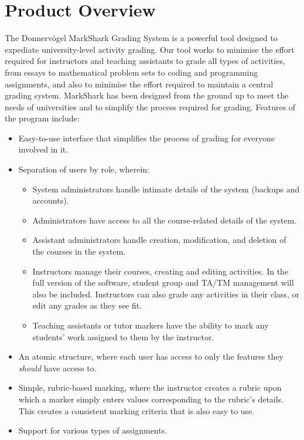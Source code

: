 \documentclass{article}
\begin{document}
\section{Product Overview}  %
The Donnervögel MarkShark Grading System is a powerful tool designed to 
expediate university-level activity grading. Our tool works to minimise the effort 
required for instructors and teaching assistants to grade all types of activities, 
from essays to mathematical problem sets to coding and programming assignments,
and also to minimise the effort required to maintain a central grading system.
MarkShark has been designed from the ground up to meet the needs of universities and 
to simplify the process required for grading. Features of the program include:
\begin{itemize}
  \item Easy-to-use interface that simplifies the process of grading for everyone
    involved in it.
  \item Separation of users by role, wherein:
    \begin{itemize}
      \item System administrators handle intimate details of the system (backups and
	accounts).
      \item Administrators have access to all the course-related details of the system.
      \item Assistant administrators handle creation, modification, and deletion of the
	courses in the system.
      \item Instructors manage their courses, creating and editing activities.
        In the full version of the software, student group and TA/TM management
        will also be included. Instructors can also grade any activities in their
        class, or edit any grades as they see fit.
      \item Teaching assistants or tutor markers have the ability to mark any students'
	work assigned to them by the instructor.
    \end{itemize}
  \item An atomic structure, where each user has access to only the features they 
    \emph{should} have access to.
  \item Simple, rubric-based marking, where the instructor creates a rubric upon which
    a marker simply enters values corresponding to the rubric's details. This creates
    a consistent marking criteria that is also easy to use.
  \item Support for various types of assignments. 

\end{itemize}
\end{document}
